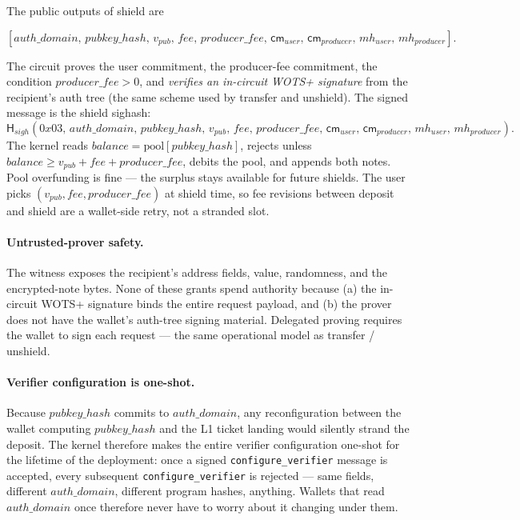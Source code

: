 \documentclass[11pt]{article}
\newcommand{\Hash}{\mathsf{H}}
\newcommand{\cm}{\mathsf{cm}}
\begin{document}
The public outputs of shield are

\[
[auth\_domain,\, pubkey\_hash,\, v_{pub},\, fee,\, producer\_fee,\, \cm_{user},\, \cm_{producer},\,
 mh_{user},\, mh_{producer}].
\]

The circuit proves the user commitment, the producer-fee commitment, the
condition \(producer\_fee > 0\), and \emph{verifies an in-circuit WOTS+
signature} from the recipient's auth tree (the same scheme used by
transfer and unshield). The signed message is the shield sighash:
\[
\Hash_{sigh}(0x03,\, auth\_domain,\, pubkey\_hash,\, v_{pub},\, fee,\, producer\_fee,\,
              \cm_{user},\, \cm_{producer},\, mh_{user},\, mh_{producer}).
\]
The kernel reads \(balance = \mathrm{pool}[pubkey\_hash]\), rejects unless
\(balance \ge v_{pub} + fee + producer\_fee\), debits the pool, and
appends both notes. Pool overfunding is fine — the surplus stays
available for future shields. The user picks
\((v_{pub}, fee, producer\_fee)\) at shield time, so fee revisions
between deposit and shield are a wallet-side retry, not a stranded slot.

\paragraph{Untrusted-prover safety.} The witness exposes the recipient's
address fields, value, randomness, and the encrypted-note bytes. None of these
grants spend authority because (a) the in-circuit WOTS+ signature binds the
entire request payload, and (b) the prover does not have the wallet's
auth-tree signing material. Delegated proving requires the wallet to
sign each request — the same operational model as transfer / unshield.

\paragraph{Verifier configuration is one-shot.} Because
\(pubkey\_hash\) commits to \(auth\_domain\), any reconfiguration
between the wallet computing \(pubkey\_hash\) and the L1 ticket landing
would silently strand the deposit. The kernel therefore makes the
entire verifier configuration one-shot for the lifetime of the
deployment: once a signed \texttt{configure\_verifier} message is
accepted, every subsequent \texttt{configure\_verifier} is rejected —
same fields, different \(auth\_domain\), different program hashes,
anything. Wallets that read \(auth\_domain\) once therefore never have
to worry about it changing under them.
\end{document}
